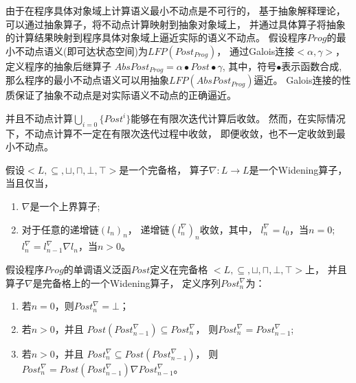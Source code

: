 由于在程序具体对象域上计算语义最小不动点是不可行的，
基于抽象解释理论，可以通过抽象算子，将不动点计算映射到抽象对象域上，
并通过具体算子将抽象的计算结果映射到程序具体对象域上逼近实际的语义不动点。
假设程序$Prog$的最小不动点语义(即可达状态空间)为$LFP(Post_{Prog})$，
通过Galois连接$<\alpha, \gamma>$，定义程序的抽象后继算子
$AbsPost_{Prog} = \alpha \bullet Post \bullet \gamma$,
其中，符号$\bullet$表示函数合成,
那么程序的最小不动点语义可以用抽象$LFP(AbsPost_{Prog})$逼近。
Galois连接的性质保证了抽象不动点是对实际语义不动点的正确逼近。

并且不动点计算$\bigcup_{i=0}\{Post^{i}\}$能够在有限次迭代计算后收敛。
然而，在实际情况下，不动点计算不一定在有限次迭代过程中收敛，
即便收敛，也不一定收敛到最小不动点。

\begin{definition}[Widening算子]
假设$<L,\subseteq, \sqcup, \sqcap, \bot,\top>$是一个完备格，
算子$\nabla: L \rightarrow L$是一个Widening算子，当且仅当，
\begin{enumerate}
\item $\nabla$是一个上界算子;
\item 对于任意的递增链$(l_n)_n$，
递增链$(l_{n}^{\nabla})_n$收敛，其中，
$l_{n}^{\nabla} = l_0$，当$n=0$;
 $l_{n}^{\nabla} = l_{n-1}^{\nabla} \nabla l_n$，当$n>0$。
\end{enumerate}
\end{definition}

假设程序$Prog$的单调语义泛函$Post$定义在完备格
$<L,\subseteq, \sqcup, \sqcap, \bot,\top>$上，
并且算子$\nabla$是完备格上的一个Widening算子，
定义序列$Post_{n}^{\nabla}$为：

\begin{enumerate}
\item 若$n=0$，则$Post_{n}^{\nabla} = \bot$；
\item 若$n > 0$，并且
$Post(Post_{n-1}^{\nabla}) \subseteq Post_{n}^{\nabla}$，
则$Post_{n}^{\nabla} = Post_{n-1}^{\nabla}$;
\item 若$n > 0$，并且
$Post_{n}^{\nabla} \subseteq Post(Post_{n-1}^{\nabla})$，
则$Post_{n}^{\nabla} = Post(Post_{n-1}^{\nabla}) \nabla  Post_{n-1}^{\nabla}$。
\end{enumerate}

